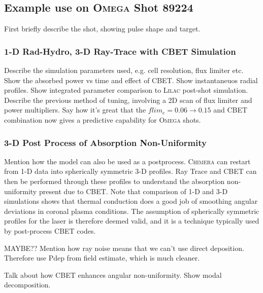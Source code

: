 \subsection{Example use on \textsc{Omega} Shot 89224}

First briefly describe the shot, showing pulse shape and target.

\subsubsection{1-D Rad-Hydro, 3-D Ray-Trace with CBET Simulation}

Describe the simulation parameters used, e.g. cell resolution, flux limiter etc.
Show the absorbed power vs time and effect of CBET.
Show instantaneuos radial profiles.
Show integrated parameter comparison to \textsc{Lilac} post-shot simulation.
Describe the previous method of tuning, involving a 2D scan of flux limiter and power multipliers.
Say how it's great that the $flim_e = 0.06 \rightarrow 0.15$ and CBET combination now gives a predictive capability for \textsc{Omega} shots.

\subsubsection{3-D Post Process of Absorption Non-Uniformity}

Mention how the model can also be used as a postprocess.
\textsc{Chimera} can restart from 1-D data into spherically symmetric 3-D profiles.
Ray Trace and CBET can then be performed through these profiles to understand the absorption non-uniformity present due to CBET.
Note that comparison of 1-D and 3-D simulations shows that thermal conduction does a good job of smoothing angular deviations in coronal plasma conditions.
The assumption of spherically symmetric profiles for the laser is therefore deemed valid, and it is a technique typically used by post-process CBET codes.

MAYBE??
Mention how ray noise means that we can't use direct deposition.
Therefore use Pdep from field estimate, which is much cleaner.

Talk about how CBET enhances angular non-uniformity.
Show modal decomposition.


